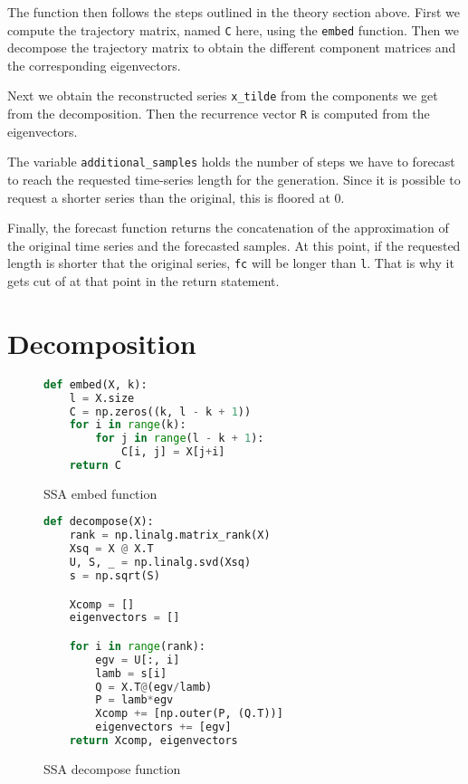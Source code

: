 The function then follows the steps outlined in the theory section above. First we compute the trajectory matrix, named \texttt{C} here, using the \texttt{embed} function. Then we decompose the trajectory matrix to obtain the different component matrices and the corresponding eigenvectors. 

Next we obtain the reconstructed series \texttt{x\_tilde} from the components we get from the decomposition. Then the recurrence vector \texttt{R} is computed from the eigenvectors. 

The variable \texttt{additional\_samples} holds the number of steps we have to forecast to reach the requested time-series length for the generation. Since it is possible to request a shorter series than the original, this is floored at 0. 

Finally, the forecast function returns the concatenation of the approximation of the original time series and the forecasted samples. At this point, if the requested length is shorter that the original series, \texttt{fc} will be longer than \texttt{l}. That is why it gets cut of at that point in the return statement.

\newpage

\section{Decomposition}

\begin{figure}
\begin{singlespace}
\begin{lstlisting}[language=Python]
def embed(X, k):
    l = X.size
    C = np.zeros((k, l - k + 1))
    for i in range(k):
        for j in range(l - k + 1):
            C[i, j] = X[j+i]
    return C
\end{lstlisting}
\end{singlespace}
\caption{SSA embed function}    
\label{fig:ssa-embed}
\end{figure}

\begin{figure}
\begin{singlespace}
\begin{lstlisting}[language=Python]
def decompose(X):
    rank = np.linalg.matrix_rank(X)
    Xsq = X @ X.T
    U, S, _ = np.linalg.svd(Xsq)
    s = np.sqrt(S)

    Xcomp = []
    eigenvectors = []

    for i in range(rank):
        egv = U[:, i]
        lamb = s[i]
        Q = X.T@(egv/lamb)
        P = lamb*egv
        Xcomp += [np.outer(P, (Q.T))]
        eigenvectors += [egv]
    return Xcomp, eigenvectors
\end{lstlisting}
\end{singlespace}
\caption{SSA decompose function}    
\label{fig:ssa-decompose}
\end{figure}

